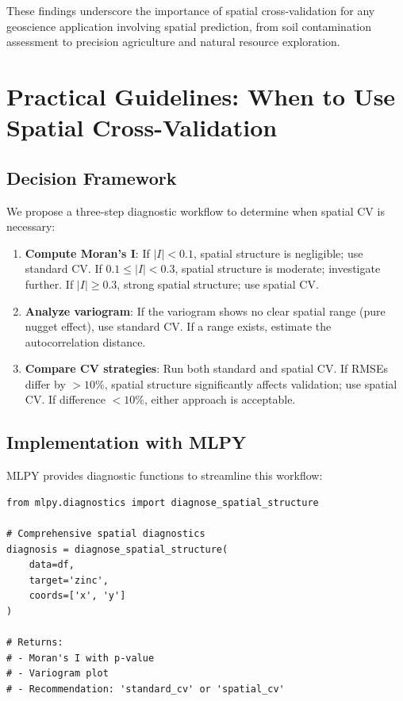 \documentclass[a4paper,fleqn]{cas-sc}
\begin{document}
These findings underscore the importance of spatial cross-validation for any geoscience application involving spatial prediction, from soil contamination assessment to precision agriculture and natural resource exploration.


\section{Practical Guidelines: When to Use Spatial Cross-Validation}
\label{sec:guidelines}

\subsection{Decision Framework}

We propose a three-step diagnostic workflow to determine when spatial CV is necessary:

\begin{enumerate}
\item \textbf{Compute Moran's I}: If $|I| < 0.1$, spatial structure is negligible; use standard CV. If $0.1 \leq |I| < 0.3$, spatial structure is moderate; investigate further. If $|I| \geq 0.3$, strong spatial structure; use spatial CV.

\item \textbf{Analyze variogram}: If the variogram shows no clear spatial range (pure nugget effect), use standard CV. If a range exists, estimate the autocorrelation distance.

\item \textbf{Compare CV strategies}: Run both standard and spatial CV. If RMSEs differ by $>10\%$, spatial structure significantly affects validation; use spatial CV. If difference $<10\%$, either approach is acceptable.
\end{enumerate}

\subsection{Implementation with MLPY}

MLPY provides diagnostic functions to streamline this workflow:

\begin{verbatim}
from mlpy.diagnostics import diagnose_spatial_structure

# Comprehensive spatial diagnostics
diagnosis = diagnose_spatial_structure(
    data=df,
    target='zinc',
    coords=['x', 'y']
)

# Returns:
# - Moran's I with p-value
# - Variogram plot
# - Recommendation: 'standard_cv' or 'spatial_cv'
\end{verbatim}
\end{document}
